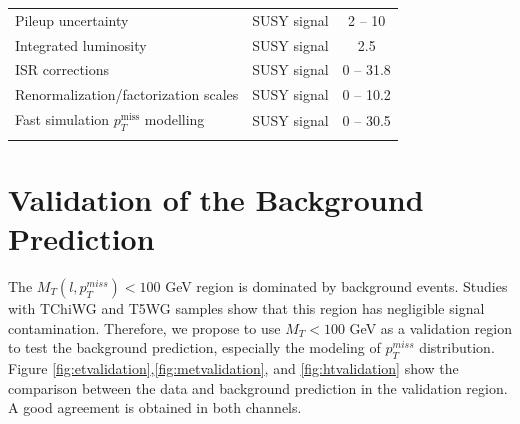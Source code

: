 \documentclass[thesis.tex]{subfiles}
\renewcommand\_{\textunderscore\allowbreak}
\begin{document}
\begin{table}[ht]
{\begin{tabular}{llc}
  Pileup uncertainty                            & SUSY signal           & 2 -- 10                       \\
  Integrated luminosity                         & SUSY signal           & 2.5                           \\
  ISR corrections                               & SUSY signal           & 0 -- 31.8                     \\
  Renormalization/factorization scales          & SUSY signal           & 0 -- 10.2                     \\
  Fast simulation $p_T^{\text{miss}}$ modelling & SUSY signal           & 0 -- 30.5                     \\
\hline \\
  \end{tabular}
  }
\end{table}


\section{Validation of the Background Prediction}

The $M_T(l, p_{T}^{miss}) < 100$ GeV region is dominated by background events. Studies with TChiWG and T5WG samples show that this region has negligible signal contamination. Therefore, we propose to use $M_T < 100$ GeV as a validation region to test the background prediction, especially the modeling of $p_T^{miss}$ distribution. Figure \ref{fig:etvalidation},\ref{fig:metvalidation}, and \ref{fig:htvalidation} show the comparison between the data and background prediction in the validation region. A good agreement is obtained in both channels.
\end{document}
